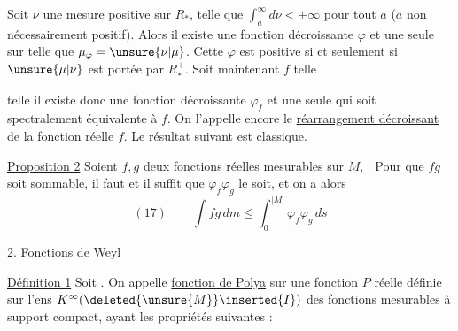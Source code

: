 Soit \(\nu\) une mesure positive sur \(R_*\), telle que \(\int_a^\infty d\nu<+\infty\) pour tout \(a\) (\(a\) non nécessairement positif).  Alors il existe une fonction décroissante \(\varphi\) et une seule sur \inserted{\(R_*^+\) (resp. \deleted{\(\unsure{]0,M[}\)} sur \(]0,M[\))} telle que \(\mu_\varphi=\unsure{\nu|\mu}\). Cette \(\varphi\) est positive si et seulement si \(\unsure{\mu|\nu}\) est portée par \(R_*^+\).  Soit maintenant \(f\) telle



 telle  il existe donc une fonction décroissante \(\varphi_f\) et une seule \inserted{sur \(]0,|M|[\)} qui soit spectralement équivalente à \(f\). On l'appelle encore le \uline{réarrangement décroissant} de la fonction réelle \(f\). Le résultat suivant est classique.

\uline{Proposition 2} Soient \(f,g\) deux fonctions réelles mesurables sur \(M\),  \(\bigl|\) Pour que \(fg\) soit sommable, il faut et il suffit que \(\varphi_f\varphi_g\) le soit, et on a alors
\[
(17)\qquad\int fg\,dm\leq\int_0^{|M|}\varphi_f\varphi_g\,ds
\]



2. \uline{Fonctions de Weyl}


\uline{Définition 1} Soit  \inserted{\(I=]0,\omega[\quad(0<\omega\le+\infty)\)}. On appelle \uline{fonction de Polya} sur  une fonction \(P\) réelle définie sur l'ens \(K^\infty(\deleted{\unsure{M}}\inserted{I})\) des fonctions mesurables à support compact, ayant les propriétés suivantes :

